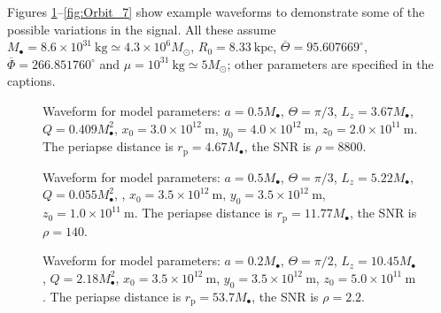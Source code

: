 \documentclass[useAMS,usedcolumn,usegraphicx,usenatbib]{mn2e}
\newcommand{\units}[1]{\ensuremath{~\mathrm{#1}}}
\newcommand{\sub}[1]{\ensuremath{_\mathrm{#1}}}
\begin{document}
Figures \ref{fig:Orbit_1}--\ref{fig:Orbit_7} show example waveforms to demonstrate some of the possible variations in the signal. All these assume $M_\bullet = 8.6 \times 10^{31}\units{kg} \simeq 4.3 \times 10^6 M_\odot$, $R_0 = 8.33\units{kpc}$, $\overline{\Theta} = {95.607669}^{\circ}$, $\overline{\Phi} = {266.851760}^{\circ}$ and $\mu = 10^{31}\units{kg} \simeq 5 M_\odot$; other parameters are specified in the captions.
\begin{figure}
  \begin{center}
    \caption{Waveform for model parameters: $a = 0.5 M_\bullet$, $\Theta = \pi/3$, $L_z = 3.67 M_\bullet$, $Q = 0.409 M_\bullet^2$, $x_0 = 3.0 \times 10^{12}\units{m}$, $y_0 = 4.0 \times 10^{12}\units{m}$, $z_0 = 2.0 \times 10^{11}\units{m}$. The periapse distance is $r\sub{p} = 4.67 M_\bullet$, the SNR is $\rho = 8800$.}
    \label{fig:Orbit_1}
  \end{center}
\end{figure}
\begin{figure}
  \begin{center}
    \caption{Waveform for model parameters: $a = 0.5 M_\bullet$, $\Theta = \pi/3$, $L_z = 5.22 M_\bullet$, $Q = 0.055 M_\bullet^2$, , $x_0 = 3.5 \times 10^{12}\units{m}$, $y_0 = 3.5 \times 10^{12}\units{m}$, $z_0 = 1.0 \times 10^{11}\units{m}$. The periapse distance is $r\sub{p} = 11.77 M_\bullet$, the SNR is $\rho = 140$.}
    \label{fig:Orbit_2}
  \end{center}
\end{figure}
\begin{figure}
  \begin{center}
    \caption{Waveform for model parameters: $a = 0.2 M_\bullet$, $\Theta = \pi/2$, $L_z = 10.45 M_\bullet$, $Q = 2.18 M_\bullet^2$, $x_0 = 3.5 \times 10^{12}\units{m}$, $y_0 = 3.5 \times 10^{12}\units{m}$, $z_0 = 5.0 \times 10^{11}\units{m}$. The periapse distance is $r\sub{p} = 53.7 M_\bullet$, the SNR is $\rho = 2.2$.}
    \label{fig:Orbit_5}
  \end{center}
\end{figure}
\end{document}
